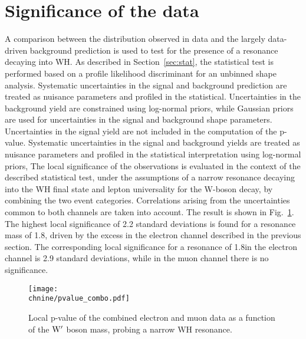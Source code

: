 \section{Significance of the data}\label{sec:signif8TeV}

A comparison between the \mWH distribution observed in data and the largely data-driven
background prediction is used to test for the presence of a resonance decaying into WH.
As described in Section~\ref{sec:stat}, the statistical test is performed based on a profile likelihood discriminant for an unbinned shape analysis.
Systematic uncertainties in the signal and background prediction are treated as nuisance parameters and profiled in the statistical.
Uncertainties in the background yield are constrained using log-normal priors, while Gaussian priors are used for uncertainties in the signal and background shape parameters.
Uncertainties in the signal yield are not included in the computation of the p-value.
Systematic uncertainties in the signal and background yields are treated as nuisance parameters and profiled in the statistical interpretation using log-normal priors,
The local significance of the observations is evaluated in the context of the described statistical test,
under the assumptions of a narrow resonance decaying into the WH final state and lepton universality for the W-boson decay, by combining the two event categories.
Correlations arising from the uncertainties common to both channels are taken into account.
The result is shown in Fig.~\ref{fig:sigWH}. The highest local significance of 2.2 standard deviations is found for a resonance mass of 1.8\TeV, driven by the excess in the electron channel described in the previous section.
The corresponding local significance for a resonance of 1.8\TeV in the electron channel is 2.9 standard deviations, while in the muon channel there is no significance.

\begin{figure}[!htb]
\centering
     \texttt{[image: \\chnine/pvalue\_combo.pdf]}
\caption{
  Local p-value of the combined electron and muon data as a function of the $\mathrm{W}^\prime$ boson mass,
  probing a narrow WH resonance.
}
\label{fig:sigWH}
\end{figure}

